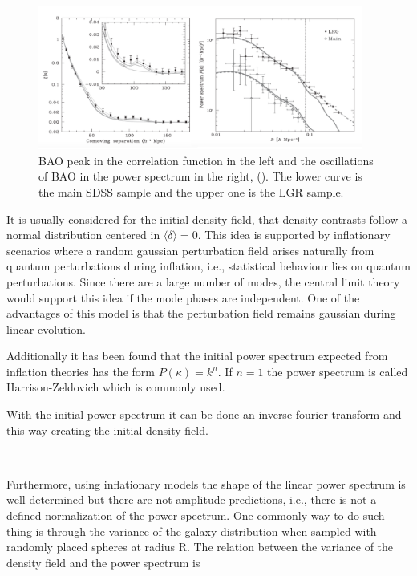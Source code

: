 \

\begin{figure}[htbp]
       \centering
               \includegraphics[width=0.95\textwidth]{./Images/chapter2/PS_CF.png}
       \caption{\small BAO peak in the correlation function in the left and the oscillations of BAO in the power spectrum in the right,
       (\cite{PLOT}).  
       The lower curve is the main SDSS sample and the upper one is the LGR sample. }
       \label{ps_cf}
 \end{figure}

It is usually considered for the initial density field, that density contrasts 
follow a normal distribution centered in $\langle \delta \rangle = 0$. This idea is supported by
inflationary scenarios where a random gaussian perturbation field arises naturally from quantum 
perturbations during inflation, i.e., statistical behaviour lies on quantum perturbations. 
Since there are a large number of modes, the central limit theory 
would support this idea if the mode phases are independent. 
One of the advantages of this model is that the perturbation field remains gaussian during linear evolution. 

Additionally it has been found that the initial power spectrum expected from inflation theories 
has the form $P(\kappa)= k^n$. If $n=1$ the power spectrum is called Harrison-Zeldovich which is 
commonly used. 

With the initial power spectrum it can be done an inverse fourier transform and this way creating the initial density field. 

\

Furthermore, using inflationary models the shape of the linear power spectrum is well 
determined but there are not amplitude predictions, i.e., there is not a defined 
normalization of the power spectrum. 
One commonly way to do such thing is through the variance of the galaxy distribution when
sampled with randomly placed spheres at radius R. The relation between the variance of the 
density field and the power spectrum is

